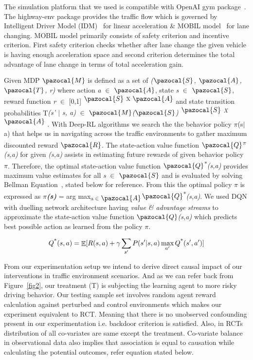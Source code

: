 \documentclass[a4, conference]{IEEEtran}
\begin{document}
    The simulation platform that we used is compatible with OpenAI gym package~\cite{brockman2016openai}. The highway-env package provides the traffic flow which is governed by Intelligent Driver Model (IDM)~\cite{treiber2000congested} for linear acceleration \& MOBIL model~\cite{kesting2007general} for lane changing. MOBIL model primarily consists of safety criterion and incentive criterion. First safety criterion checks whether after lane change the given vehicle is having enough acceleration space and second criterion determines the total advantage of lane change in terms of total acceleration gain.

    Given MDP \( \pazocal{M} \) is defined as a set of \textit{(\( \pazocal{S} \), \( \pazocal{A} \), \( \pazocal{T} \), r)} where action \textit{a} $\in$ \( \pazocal{A} \), state \textit{s} $\in$ \( \pazocal{S} \), reward function \textit{r} $\in$ [0,1]\textsuperscript{ \( \pazocal{S} \) X \( \pazocal{A} \) } and state transition probabilities T\textit{(s' $\mid$ s, a)} $\in$ \textit{\( \pazocal{M} \)(\( \pazocal{S} \))\textsuperscript{ \( \pazocal{S} \) X \( \pazocal{A} \) }}. With Deep-RL algorithms we search the the behavior policy $\pi$(s$\mid$a) that helps us in navigating across the traffic environments to gather maximum discounted reward \( \pazocal{R} \). The state-action value function \textit{\( \pazocal{Q} \)\textsuperscript{$\pi$}(s,a) } for given \textit{(s,a)} assists in estimating future rewards of given behavior policy $\pi$. Therefore, the optimal state-action value function \textit{\( \pazocal{Q} \)\textsuperscript{$*$}(s,a)} provides maximum value estimates for all \textit{s} $\in$ \( \pazocal{S} \) and is evaluated by solving Bellman Equation~\cite{bellman2015applied}, stated below for reference. From this the optimal policy $\pi$ is expressed as \textit{\textbf{$\pi$(s)}} = arg max\textsubscript{a$\in$\(\pazocal{A}\)}\textit{\( \pazocal{Q} \)\textsuperscript{$*$}(s,a)}. We used DQN with duelling network architecture having \textit{value \& advantage streams} to approximate the state-action value function \textit{ \( \pazocal{Q} \)(s,a) } which predicts best possible action as learned from the policy $\pi$.

    \begin{equation}
        Q \textsuperscript{*} (s, a) = \mathop{\mathbb{E}} [ R(s,a) + \gamma \sum \limits _{s'} P (s' | s , a) \max \limits _{a'} Q \textsuperscript{*} (s', a') ]
    \end{equation}

    From our experimentation setup we intend to derive direct causal impact of our interventions in traffic environment scenarios. And as we can refer back from Figure~\ref{fig2}, our treatment (T) is subjecting the learning agent to more risky driving behavior. Our testing sample set involves random agent reward calculation against perturbed and control environments which makes our experiment equivalent to RCT. Meaning that there is no unobserved confounding present in our experimentation i.e. backdoor criterion is satisfied. Also, in RCTs distribution of all co-variates are same except the treatment. Co-variate balance in observational data also implies that association is equal to causation while calculating the potential outcomes, refer equation stated below.
\end{document}
